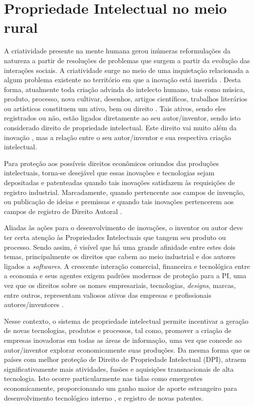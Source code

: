 \section{Propriedade Intelectual no meio rural}

A criatividade presente na mente humana gerou inúmeras reformulações da natureza a partir de resoluções de problemas que surgem a partir da evolução das interações sociais. A criatividade surge no meio de uma inquietação relacionada a algum problema existente no território em que a inovação está inserida \cite{pacheco_dos_2018}. Desta forma, atualmente toda criação advinda do intelecto humano, tais como música, produto, processo, nova cultivar, desenhos, artigos científicos, trabalhos literários ou artísticos constituem um ativo, bem ou direito \cite{costa_interseccao_2011}. Tais ativos, sendo eles registrados ou não, estão ligados diretamente ao seu autor/inventor, sendo isto considerado direito de propriedade intelectual. Este direito vai muito além da inovação \cite{wipo_tratado_1970}, mas a relação entre o seu autor/inventor e sua respectiva criação intelectual.

Para proteção aos possíveis direitos econômicos oriundos das produções intelectuais, torna-se desejável que essas inovações e tecnologias sejam depositadas e patenteadas quando tais inovações satisfazem às requisições de registro industrial. Marcadamente, quando pertencente aos campos de invenção, ou publicação de ideias e premissas e quando tais inovações pertencerem aos campos de registro de Direito Autoral \cite{wipo_b06_2019}. 

Aliadas às ações para o desenvolvimento de inovações, o inventor ou autor deve ter certa atenção às Propriedades Intelectuais que tangem seu produto ou processo. Sendo assim, é visível que há uma grande afinidade entre estes dois temas, principalmente os direitos que cabem ao meio industrial e dos autores ligados a \textit{softwares}. A crescente interação comercial, financeira e tecnológica entre a economia e seus agentes exigem padrões modernos de proteção para a PI, uma vez que os direitos sobre os nomes empresariais, tecnologias, \textit{designs}, marcas, entre outros, representam valiosos ativos das empresas e profissionais autores/inventores \cite{sherwood_propriedade_1992}. 

Nesse contexto, o sistema de propriedade intelectual permite incentivar a geração de novas tecnologias, produtos e processos, tal como, promover a criação de empresas inovadoras em todas as áreas de informação, uma vez que concede ao autor/inventor explorar economicamente suas produções. Da mesma forma que os países com melhor proteção de Direito de Propriedade Intelectual (DPI), atraem significativamente mais atividades, fusões e aquisições transnacionais de alta tecnologia. Isto ocorre particularmente nas tidas como emergentes economicamente, proporcionando um ganho maior de aporte estrangeiro para desenvolvimento tecnológico interno \cite{hasan_impacts_2017}, e registro de novas patentes.

